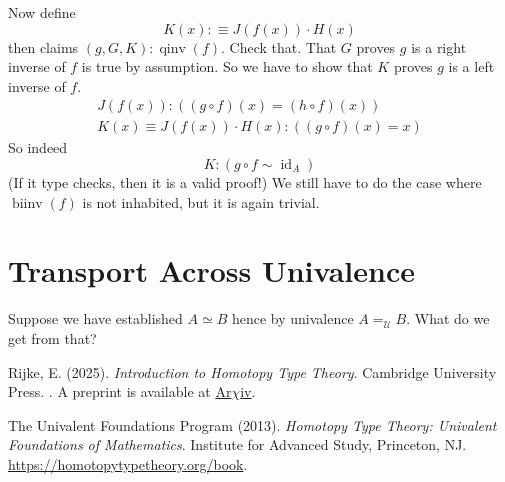 \documentclass[11pt]{article}
\newcommand{\universe}{\mathcal{U}}
\DeclareMathOperator{\idfun}{id}
\DeclareMathOperator{\biinv}{biinv}
\DeclareMathOperator{\qinv}{qinv}
\begin{document}
Now define
$$
   K(x) :\equiv J(f(x)) \cdot H(x)
$$
 then claims $(g, G, K) : \qinv(f)$.  Check that.
That $G$ proves $g$ is a right inverse of $f$ is true by assumption.
So we have to show that $K$ proves $g$ is a left inverse of $f$.
\begin{gather*}
   J(f(x)) : ((g \circ f)(x) = (h \circ f)(x))
   \\
   K(x) \equiv J(f(x)) \cdot H(x) : ((g \circ f)(x) = x)
\end{gather*}
So indeed
$$
   K : (g \circ f \sim \idfun_A)
$$
(If it type checks, then it is a valid proof!)
We still have to do the case where $\biinv(f)$ is not inhabited,
but it is again trivial.

\section{Transport Across Univalence}

Suppose we have established $A \simeq B$ hence by univalence $A =_\universe B$.
What do we get from that?

\begin{thebibliography}{}

Rijke, E. (2025).
\newblock \emph{Introduction to Homotopy Type Theory}.
\newblock Cambridge University Press.
\newblock {}.
\newblock A preprint is available at
    \href{https://arxiv.org/abs/2212.11082}{Ar$\chi$iv}.

The Univalent Foundations Program (2013).
\newblock \emph{Homotopy Type Theory: Univalent Foundations of Mathematics}.
\newblock Institute for Advanced Study, Princeton, NJ.
\newblock \url{https://homotopytypetheory.org/book}.

\end{thebibliography}
\end{document}
